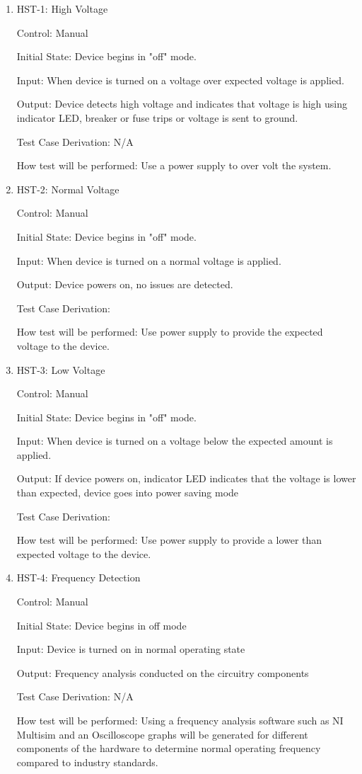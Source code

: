 \documentclass[12pt, titlepage]{article}
\begin{document}
\begin{enumerate}

\item{HST-1: High Voltage\\}

Control: Manual 

Initial State: Device begins in "off" mode.

Input: When device is turned on a voltage over expected voltage is applied.

Output: Device detects high voltage and indicates that voltage is high using indicator LED, breaker or fuse trips or voltage is sent to ground.

Test Case Derivation: N/A

How test will be performed: Use a power supply to over volt the system. 

\item{HST-2: Normal Voltage\\}

Control: Manual

Initial State: Device begins in "off" mode.

Input: When device is turned on a normal voltage is applied.

Output: Device powers on, no issues are detected.

Test Case Derivation:

How test will be performed: Use power supply to provide the expected voltage to the device.

\item{HST-3: Low Voltage\\}

Control: Manual

Initial State: Device begins in "off" mode.

Input: When device is turned on a voltage below the expected amount is applied.

Output: If device powers on, indicator LED indicates that the voltage is lower than expected, device goes into power saving mode

Test Case Derivation:

How test will be performed: Use power supply to provide a lower than expected voltage to the device.

\item{HST-4: Frequency Detection\\}

Control: Manual

Initial State: Device begins in off mode

Input: Device is turned on in normal operating state

Output: Frequency analysis conducted on the circuitry components

Test Case Derivation: N/A

How test will be performed: Using a frequency analysis software such as NI Multisim and an Oscilloscope graphs will be generated for different components of the hardware to determine normal operating frequency compared to industry standards.

\end{enumerate}
\end{document}
